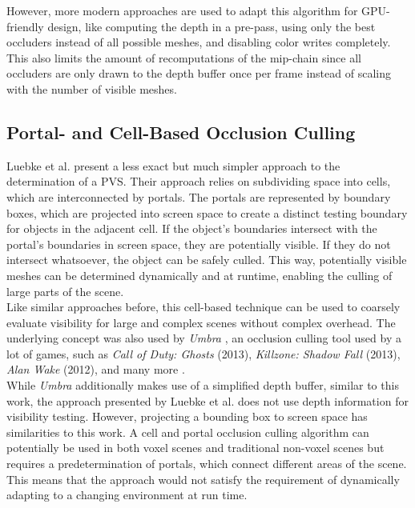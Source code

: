 \noindent
However, more modern approaches are used to adapt this algorithm for \ac{GPU}-friendly design, like computing the depth 
in a pre-pass, using only the best occluders instead of all possible meshes, and disabling color writes completely. This 
also limits the amount of recomputations of the mip-chain since all occluders are only drawn to the depth buffer once per 
frame instead of scaling with the number of visible meshes.


\subsection*{Portal- and Cell-Based Occlusion Culling}

Luebke et al. \cite{Luebke1995} present a less exact but much simpler approach to the determination
of a \ac{PVS}. Their approach relies on subdividing space into cells, which are interconnected by 
portals. The portals are represented by boundary boxes, which are projected into screen space to 
create a distinct testing boundary for objects in the adjacent cell. If the object's boundaries 
intersect with the portal's boundaries in screen space, they are potentially visible. If they do 
not intersect whatsoever, the object can be safely culled. This way, potentially visible meshes can 
be determined dynamically and at runtime, enabling the culling of large parts of the scene. \\

\noindent
Like similar approaches before, this cell-based technique can be used to coarsely evaluate visibility 
for large and complex scenes without complex overhead. The underlying concept was also used by 
\emph{Umbra} \cite{Umbra2024}, an occlusion culling tool used by a lot of games, such as 
\emph{Call of Duty: Ghosts} (2013), \emph{Killzone: Shadow Fall} (2013), \emph{Alan Wake} (2012), 
and many more \cite{UmbraWiki,CallOfDutyGhostsCredits,KillzoneUmbra,AlanWakeUmbra}. \\

\noindent
While \emph{Umbra} additionally makes use of a simplified depth buffer, similar to this work, the approach 
presented by Luebke et al. does not use depth information for visibility testing. However, projecting a 
bounding box to screen space has similarities to this work. A cell and portal occlusion culling algorithm 
can potentially be used in both voxel scenes and traditional non-voxel scenes but requires a 
predetermination of portals, which connect different areas of the scene. This means that the approach would 
not satisfy the requirement of dynamically adapting to a changing environment at run time. \\


